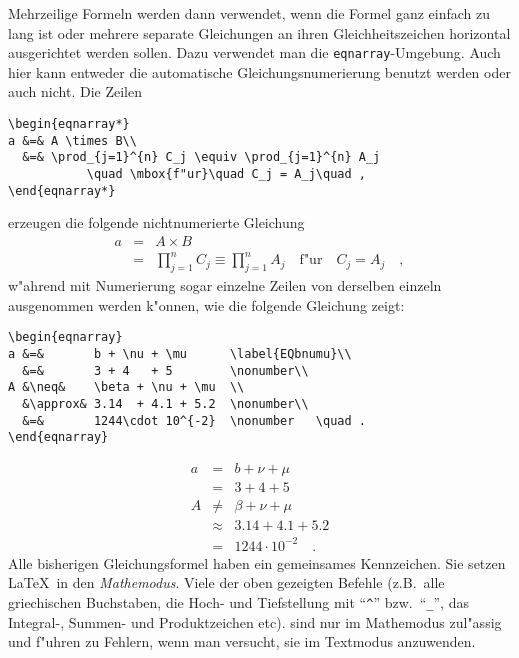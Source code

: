 Mehrzeilige Formeln werden dann verwendet, wenn die Formel ganz einfach zu lang ist
oder mehrere separate Gleichungen an ihren Gleichheitszeichen horizontal ausgerichtet
werden sollen. Dazu verwendet man die {\tt eqnarray}-Umgebung. 
Auch hier kann entweder die automatische Gleichungsnumerierung benutzt 
werden oder auch nicht.
Die Zeilen
%
\begin{verbatim}
\begin{eqnarray*}
a &=& A \times B\\
  &=& \prod_{j=1}^{n} C_j \equiv \prod_{j=1}^{n} A_j  
           \quad \mbox{f"ur}\quad C_j = A_j\quad ,  
\end{eqnarray*}
\end{verbatim}
%
erzeugen die folgende nichtnumerierte Gleichung
%
\begin{eqnarray*}
a &=& A \times B\\
  &=& \prod_{j=1}^{n} C_j \equiv \prod_{j=1}^{n} A_j  
           \quad \mbox{f"ur}\quad C_j = A_j\quad ,  
\end{eqnarray*}
%
w"ahrend mit Numerierung sogar einzelne Zeilen von derselben einzeln 
ausgenommen werden k"onnen, wie die folgende Gleichung zeigt:
%
\begin{verbatim}
\begin{eqnarray} 
a &=&       b + \nu + \mu      \label{EQbnumu}\\
  &=&       3 + 4   + 5        \nonumber\\
A &\neq&    \beta + \nu + \mu  \\
  &\approx& 3.14  + 4.1 + 5.2  \nonumber\\
  &=&       1244\cdot 10^{-2}  \nonumber   \quad .
\end{eqnarray}
\end{verbatim}
%
\begin{eqnarray} 
a &=&       b + \nu + \mu      \label{EQbnumu}\\
  &=&       3 + 4   + 5        \nonumber\\
A &\neq&    \beta + \nu + \mu  \\
  &\approx& 3.14  + 4.1 + 5.2  \nonumber\\
  &=&       1244\cdot 10^{-2}  \nonumber   \quad .
\end{eqnarray}
%
Alle bisherigen Gleichungsformel haben ein gemeinsames Kennzeichen.
Sie setzen \LaTeX\ in den {\em Mathemodus}. Viele der oben gezeigten Befehle
(z.B.\ alle griechischen Buchstaben, die Hoch- und Tiefstellung mit ``\verb+^+'' 
bzw.\ ``\verb+_+'', das Integral-, Summen- und Produktzeichen etc).
sind nur im Mathemodus zul"assig und f"uhren zu Fehlern, wenn man versucht,
sie im Textmodus anzuwenden.

